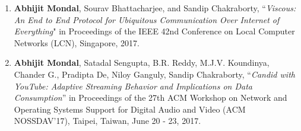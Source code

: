 {\begin{enumerate}
\item \textbf{Abhijit Mondal}, Sourav Bhattacharjee, and Sandip Chakraborty, ``\textit{Viscous: An End to End Protocol for Ubiquitous Communication Over Internet of Everything}" in Proceedings of the IEEE 42nd Conference on Local Computer Networks (LCN), Singapore, 2017.
\item \textbf{Abhijit Mondal}, Satadal Sengupta, B.R. Reddy, M.J.V. Koundinya, Chander G., Pradipta De, Niloy Ganguly, Sandip Chakraborty, ``\textit{Candid with YouTube: Adaptive Streaming Behavior and Implications on Data Consumption}'' in Proceedings of the 27th ACM Workshop on Network and Operating Systems Support for Digital Audio and Video (ACM NOSSDAV’17), Taipei, Taiwan, June 20 - 23, 2017.

\end{enumerate}
}